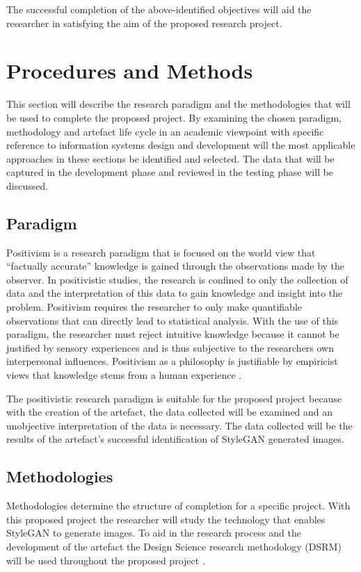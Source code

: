 The successful completion of the above-identified objectives will aid the researcher in satisfying the aim of the proposed research project.

\section{Procedures and Methods}

This section will describe the research paradigm and the methodologies that will be used to complete the proposed project. By examining the chosen paradigm, methodology and artefact life cycle in an academic viewpoint with specific reference to information systems design and development will the most applicable approaches in these sections be identified and selected. The data that will be captured in the development phase and reviewed in the testing phase will be discussed.

\subsection{Paradigm}

Positivism is a research paradigm that is focused on the world view that “factually accurate” knowledge is gained through the observations made by the observer. In positivistic studies, the research is confined to only the collection of data and the interpretation of this data to gain knowledge and insight into the problem. Positivism requires the researcher to only make quantifiable observations that can directly lead to statistical analysis. With the use of this paradigm, the researcher must reject intuitive knowledge because it cannot be justified by sensory experiences and is thus subjective to the researchers own interpersonal influences. Positivism as a philosophy is justifiable by empiricist views that knowledge stems from a human experience \citep{Collins2018}.

The positivistic research paradigm is suitable for the proposed project because with the creation of the artefact, the data collected will be examined and an unobjective interpretation of the data is necessary. The data collected will be the results of the artefact’s successful identification of StyleGAN generated images. 

\subsection{Methodologies}

Methodologies determine the structure of completion for a specific project. With this proposed project the researcher will study the technology that enables StyleGAN to generate images. To aid in the research process and the development of the artefact the Design Science research methodology (DSRM) will be used throughout the proposed project \citep{Peffers2007}.

